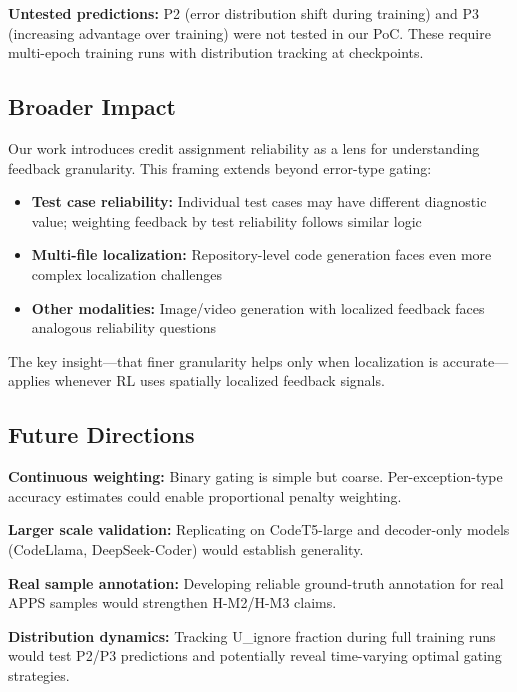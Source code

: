 \textbf{Untested predictions:} P2 (error distribution shift during training) and P3 (increasing advantage over training) were not tested in our PoC. These require multi-epoch training runs with distribution tracking at checkpoints.

\subsection{Broader Impact}

Our work introduces credit assignment reliability as a lens for understanding feedback granularity. This framing extends beyond error-type gating:
\begin{itemize}
\item \textbf{Test case reliability:} Individual test cases may have different diagnostic value; weighting feedback by test reliability follows similar logic
\item \textbf{Multi-file localization:} Repository-level code generation faces even more complex localization challenges
\item \textbf{Other modalities:} Image/video generation with localized feedback faces analogous reliability questions
\end{itemize}

The key insight---that finer granularity helps only when localization is accurate---applies whenever RL uses spatially localized feedback signals.

\subsection{Future Directions}

\textbf{Continuous weighting:} Binary gating is simple but coarse. Per-exception-type accuracy estimates could enable proportional penalty weighting.

\textbf{Larger scale validation:} Replicating on CodeT5-large and decoder-only models (CodeLlama, DeepSeek-Coder) would establish generality.

\textbf{Real sample annotation:} Developing reliable ground-truth annotation for real APPS samples would strengthen H-M2/H-M3 claims.

\textbf{Distribution dynamics:} Tracking U\_ignore fraction during full training runs would test P2/P3 predictions and potentially reveal time-varying optimal gating strategies.
